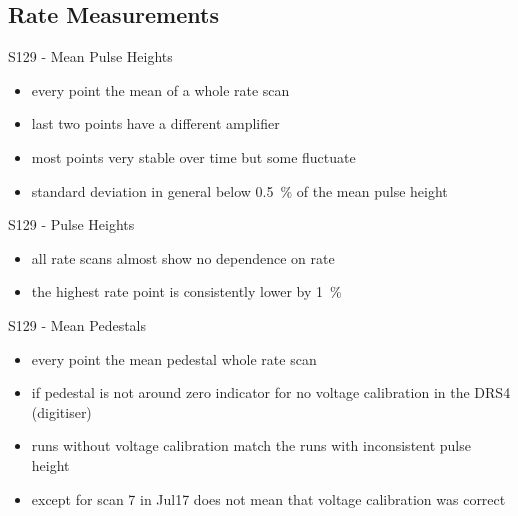 \subsection{Rate Measurements}
\begin{frame}{S129 - Mean Pulse Heights}

	\vspace*{-2ex}
	
	\begin{itemize}\itemfill
		\item every point the mean of a whole rate scan
		\item last two points have a different amplifier
		\item most points very stable over time but some fluctuate
		\item<2-> standard deviation in general below \SI{.5}{\%} of the mean pulse height
	\end{itemize}

\end{frame}
\begin{frame}{S129 - Pulse Heights}

	\vspace*{-2ex}
	
	\begin{itemize}\itemfill
		\item all rate scans almost show no dependence on rate
		\item {} the highest rate point is consistently lower by \SI{1}{\%}
	\end{itemize}

\end{frame}
\begin{frame}{S129 - Mean Pedestals}

	\vspace*{-2ex}
	
	\begin{itemize}\itemfill
		\item every point the mean pedestal whole rate scan
		\item if pedestal is not around zero \ra indicator for no voltage calibration in the DRS4 (digitiser)
		\item runs without voltage calibration match the runs with inconsistent pulse height
		\item except for scan 7 in Jul17 \ra does not mean that voltage calibration was correct
	\end{itemize}

\end{frame}
